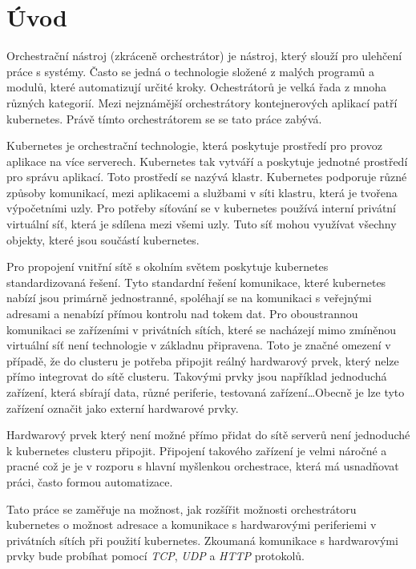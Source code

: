 \chapter*{Úvod}
\setcounter{page}{1}

Orchestrační nástroj (zkráceně orchestrátor) je nástroj, který slouží pro ulehčení práce s systémy. Často se jedná o technologie složené z malých programů a modulů, které automatizují určité kroky. Ochestrátorů je velká řada z mnoha různých kategorií. Mezi nejznámější orchestrátory kontejnerových aplikací patří kubernetes. Právě tímto orchestrátorem se se tato práce zabývá. \cite{goldberg_2019_workflow}

Kubernetes je orchestrační technologie, která poskytuje prostředí pro provoz aplikace na více serverech. Kubernetes tak vytváří a poskytuje jednotné prostředí pro správu aplikací. Toto prostředí se nazývá klastr. Kubernetes podporuje různé způsoby komunikací, mezi aplikacemi a službami v síti klastru, která je tvořena výpočetními uzly. Pro potřeby síťování se v kubernetes používá interní privátní virtuální síť, která je sdílena mezi všemi uzly. Tuto síť mohou využívat všechny objekty, které jsou součástí kubernetes.

Pro propojení vnitřní sítě s okolním světem poskytuje kubernetes standardizovaná řešení. Tyto standardní řešení komunikace, které kubernetes nabízí jsou primárně jednostranné, spoléhají se na komunikaci s veřejnými adresami a nenabízí přímou kontrolu nad tokem dat. Pro oboustrannou komunikaci se zařízeními v privátních sítích, které se nacházejí mimo zmíněnou virtuální síť není technologie v základnu připravena. Toto je značné omezení v případě, že do clusteru je potřeba připojit reálný hardwarový prvek, který nelze přímo integrovat do sítě clusteru. Takovými prvky jsou například jednoduchá zařízení, která sbírají data, různé periferie, testovaná zařízení\ldots Obecně je lze tyto zařízení označit jako externí hardwarové prvky.

Hardwarový prvek který není možné přímo přidat do sítě serverů není jednoduché k kubernetes clusteru připojit. Připojení takového zařízení je velmi náročné a pracné což je je v rozporu s hlavní myšlenkou orchestrace, která má usnadňovat práci, často formou automatizace.

Tato práce se zaměřuje na možnost, jak rozšířit možnosti orchestrátoru kubernetes o možnost adresace a komunikace s hardwarovými periferiemi v privátních sítích při použití kubernetes. Zkoumaná komunikace s hardwarovými prvky bude probíhat pomocí \textit{TCP}, \textit{UDP} a \textit{HTTP} protokolů.

